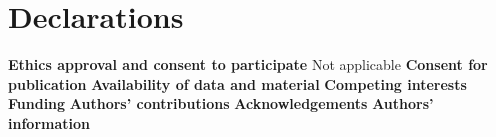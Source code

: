 \documentclass[11pt]{article}
\begin{document}

\section{Declarations}
\textbf{Ethics approval and consent to participate}
Not applicable
\textbf{Consent for publication}
\textbf{Availability of data and material}
\textbf{Competing interests}
\textbf{Funding}
\textbf{Authors' contributions}
\textbf{Acknowledgements}
\textbf{Authors' information}
\end{document}

